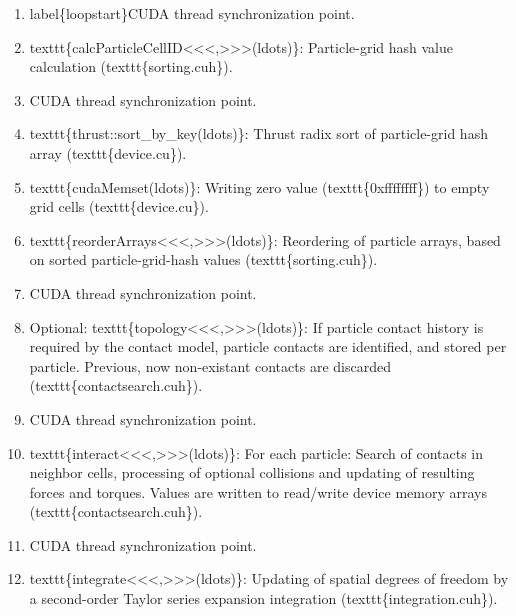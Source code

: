 \documentclass[letterpaper,10pt,english]{sphinxmanual}
\begin{document}
\begin{enumerate}
\item {} 
label\{loopstart\}CUDA thread synchronization point.

\item {} 
texttt\{calcParticleCellID\textless{}\textless{}\textless{},\textgreater{}\textgreater{}\textgreater{}(ldots)\}: Particle-grid hash value calculation (texttt\{sorting.cuh\}).

\item {} 
CUDA thread synchronization point.

\item {} 
texttt\{thrust::sort\_by\_key(ldots)\}: Thrust radix sort of particle-grid hash array (texttt\{device.cu\}).

\item {} 
texttt\{cudaMemset(ldots)\}: Writing zero value (texttt\{0xffffffff\}) to empty grid cells (texttt\{device.cu\}).

\item {} 
texttt\{reorderArrays\textless{}\textless{}\textless{},\textgreater{}\textgreater{}\textgreater{}(ldots)\}: Reordering of particle arrays, based on sorted particle-grid-hash values (texttt\{sorting.cuh\}).

\item {} 
CUDA thread synchronization point.

\item {} 
Optional: texttt\{topology\textless{}\textless{}\textless{},\textgreater{}\textgreater{}\textgreater{}(ldots)\}: If particle contact history is required by the contact model, particle contacts are identified, and stored per particle. Previous, now non-existant contacts are discarded (texttt\{contactsearch.cuh\}).

\item {} 
CUDA thread synchronization point.

\item {} 
texttt\{interact\textless{}\textless{}\textless{},\textgreater{}\textgreater{}\textgreater{}(ldots)\}: For each particle: Search of contacts in neighbor cells, processing of optional collisions and updating of resulting forces and torques. Values are written to read/write device memory arrays (texttt\{contactsearch.cuh\}).

\item {} 
CUDA thread synchronization point.

\item {} 
texttt\{integrate\textless{}\textless{}\textless{},\textgreater{}\textgreater{}\textgreater{}(ldots)\}: Updating of spatial degrees of freedom by a second-order Taylor series expansion integration (texttt\{integration.cuh\}).


\end{enumerate}
\end{document}
